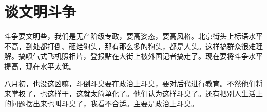 \section[谈文明斗争（一九六七年二月三日）]{谈文明斗争}


斗争要文明些，我们是无产阶级专政，要高姿态，要高风格。北京街头上标语水平不高，到处都打倒、砸烂狗头，那有那么多的狗头，都是人头。这样搞群众很难理解。搞喷气式飞机照相片，登报贴在大街上被外国记者搞走了。现在要将斗争水平提高，现在水平太低。

八月初，也没这凶嘛，斗倒斗臭要在政治上斗臭，要对后代进行教育。不然他们将来掌权了，也这样干，这就太简单化了。他们认为这样斗臭了。还有把别人生活上的问题摆出来也叫斗臭了，我看不合适。主要是政治上斗臭。


